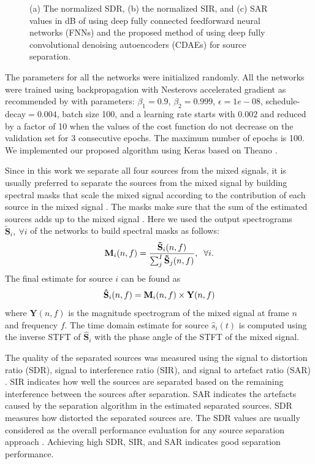 \documentclass{article}
\begin{document}
\begin{figure}
\caption[]{(a) The normalized SDR, (b) the normalized SIR, and (c) SAR values in dB of using deep fully connected feedforward neural networks (FNNs) and the proposed method of using deep fully convolutional denoising autoencoders (CDAEs) for source separation.}
\label{fig:dnn_dnn} 
\end{figure}

The parameters for all the networks were initialized randomly. All the networks were trained using backpropagation with Nesterovs accelerated gradient \cite{Nesterov:83:mscppcr} as recommended by \cite{icml2013_sutskever13} with parameters: $\beta_1=0.9$, $\beta_2=0.999$, $\epsilon=1e-08$, schedule-decay$=0.004$, batch size 100, and a learning rate starts with $0.002$ and reduced by a factor of 10 when the values of the cost function do not decrease on the validation set for 3 consecutive epochs. The maximum number of epochs is 100. We implemented our proposed algorithm using Keras based on Theano \cite{chollet2015keras,Bastien:12:theano1}.

Since in this work we separate all four sources from the mixed signals, it is usually preferred to separate the sources from the mixed signal by building spectral masks that scale the mixed signal according to the contribution of each source in the mixed signal \cite{arie:16:masswdnn,Huang:14:svsmrdrnn}. The masks make sure that the sum of the estimated sources adds up to the mixed signal \cite{erdogan:10:sbsmsusacp,grais:14:ssrnmfmmse}. Here we used the output spectrograms $\mathbf{\tilde{S}}_i,\ \forall i$ of the networks to build spectral masks as follows:
\begin{equation}
\label{mask}
\footnotesize{
\mathbf{M}_i (n,f)= \frac{\mathbf{\tilde{S}}_i(n,f)}{\sum_j^I \mathbf{\tilde{S}}_j(n,f)}, \ \ \forall i.
}
\end{equation}
The final estimate for source $i$ can be found as
\begin{equation}
\label{mask}
\footnotesize{
\mathbf{\hat{S}}_i(n,f) =  \mathbf{M}_i (n,f) \times \mathbf{Y}(n,f)
}
\end{equation}
where $\mathbf{Y}(n,f)$ is the magnitude spectrogram of the mixed signal at frame $n$ and frequency $f$. The time domain estimate for source $\hat s_i(t)$ is computed using the inverse STFT of $\hat {\mathbf{S}}_i$ with the phase angle of the STFT of the mixed signal.

The quality of the separated sources was measured using the signal to distortion ratio (SDR), signal to interference ratio (SIR), and signal to artefact ratio (SAR) \cite{vincent:06:pmi}. SIR indicates how well the sources are separated based on the remaining interference between the sources after separation. SAR indicates the artefacts caused by the separation algorithm in the estimated separated sources. SDR measures how distorted the separated sources are. The SDR values are usually considered as the overall performance evaluation for any source separation approach \cite{vincent:06:pmi}. Achieving high SDR, SIR, and SAR indicates good separation performance. 
\end{document}

